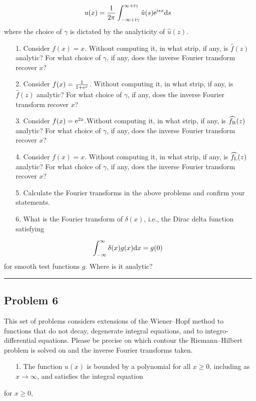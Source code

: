 \documentclass[12pt,a4paper]{article}
\def\D{ {\rm d} }
\def\I{ {\rm i} }
\def\E{ {\rm e} }
\def\dx{\D x}
\def\endash{–}
\begin{document}
\[
u(x) = {1 \over 2\pi} \int_{-\infty + \I \gamma}^{\infty + \I \gamma} \hat u(s) \E^{\I s x} \D s
\]
where the choice of $\gamma$ is dictated by the analyticity of $\hat u(z)$.

\begin{itemize}
\item[1. ] Consider $f(x) = x$. Without computing it, in what strip, if any,  is $\hat f(z)$ analytic? For what choice of $\gamma$, if any, does the inverse Fourier transform recover $x$?


\item[2. ] Consider $f(x) = {1 \over 1+ \E^x}$. Without computing it, in what strip, if any,  is $\hat f(z)$ analytic? For what choice of $\gamma$, if any, does the inverse Fourier transform recover $x$?


\item[3. ] Consider $f(x) = \E^{2 x}$.Without computing it, in what strip, if any, is $\widehat{f_{\rm R}}(z)$ analytic? For what choice of $\gamma$, if any, does the inverse Fourier transform recover $x$?


\item[4. ] Consider $f(x) = x$. Without computing it, in what strip, if any, is $\widehat{f_{\rm L}}(z)$ analytic? For what choice of $\gamma$, if any, does the inverse Fourier transform recover $x$?


\item[5. ] Calculate the Fourier transforms in the above problems and confirm your statements.


\item[6. ] What is the Fourier transform of $\delta(x)$, i.e., the Dirac delta function satisfying

\end{itemize}
\[
\int_{-\infty}^\infty \delta(x) g(x) \dx = g(0)
\]
for smooth test functions $g$. Where is it analytic?

\rule{\textwidth}{1pt}
\subsection{Problem 6}
This set of problems considers extensions of the Wiener\ensuremath{\endash}Hopf method to functions that do not decay, degenerate integral equations,  and to integro-differential equations. Please be precise on which contour the Riemann\ensuremath{\endash}Hilbert problem is solved on and the  inverse Fourier transforms  taken.

\begin{itemize}
\item[1. ] The function $u(x)$ is bounded by a polynomial for all $x \geq 0$, including as $x \rightarrow \infty$, and satisfies the integral equation

\end{itemize}
for $x \geq 0$,
\end{document}
